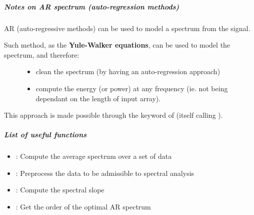 \documentclass[letterpaper,10pt,english]{sphinxmanual}
\begin{document}
\subparagraph{Notes on AR spectrum (auto-regression methods)}
\label{altimetry.tools.spectrum:notes-on-ar-spectrum-auto-regression-methods}
AR (auto-regressive methods) can be used to model a spectrum from the signal.
\begin{description}
\item[{Such method, as the \textbf{Yule-Walker equations}, can be used to model the spectrum, and therefore:}] \leavevmode\begin{itemize}
\item {} 
clean the spectrum (by having an auto-regression approach)

\item {} 
compute the energy (or power) at any frequency (ie. not being dependant on the length of input array).

\end{itemize}

\end{description}

This approach is made possible through the  keyword of {\hyperref[altimetry.tools.spectrum:altimetry.tools.spectrum.spectral_analysis]{}} (itself calling {\hyperref[altimetry.tools.spectrum:altimetry.tools.spectrum.yule_walker_regression]{}}).


\subparagraph{List of useful functions}
\label{altimetry.tools.spectrum:list-of-useful-functions}\begin{itemize}
\item {} 
{\hyperref[altimetry.tools.spectrum:altimetry.tools.spectrum.spectral_analysis]{}} : Compute the average spectrum over a set of data

\item {} 
{\hyperref[altimetry.tools.spectrum:altimetry.tools.spectrum.preprocess]{}} : Preprocess the data to be admissible to spectral analysis

\item {} 
{\hyperref[altimetry.tools.spectrum:altimetry.tools.spectrum.get_slope]{}} : Compute the spectral slope

\item {} 
{\hyperref[altimetry.tools.spectrum:altimetry.tools.spectrum.optimal_AR_spectrum]{}} : Get the order of the optimal AR spectrum

\end{itemize}
\end{document}

